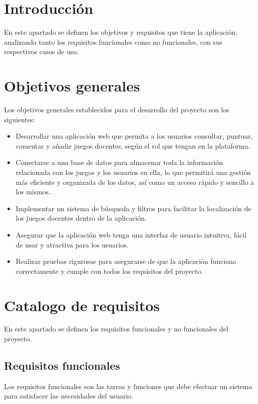 
\section{Introducción}
En este apartado se definen los objetivos y requisitos que tiene la aplicación, analizando tanto los requisitos funcionales como no funcionales, con sus respectivos casos de uso.

\section{Objetivos generales}
Los objetivos generales establecidos para el desarrollo del proyecto son los siguientes:

\begin{itemize}
    \item Desarrollar una aplicación web que permita a los usuarios consultar, puntuar, comentar y añadir juegos docentes, según el rol que tengan en la plataforma.
    \item Conectarse a una base de datos para almacenar toda la información relacionada con los juegos y los usuarios en ella, lo que permitirá una gestión más eficiente y organizada de los datos, así como un acceso rápido y sencillo a los mismos.
    \item Implementar un sistema de búsqueda y filtros para facilitar la localización de los juegos docentes dentro de la aplicación.
    \item Asegurar que la aplicación web tenga una interfaz de usuario intuitiva, fácil de usar y atractiva para los usuarios.
    \item Realizar pruebas rigurosas para asegurarse de que la aplicación funciona correctamente y cumple con todos los requisitos del proyecto.
\end{itemize}

\section{Catalogo de requisitos}
En este apartado se definen los requisitos funcionales y no funcionales del proyecto.

\subsection{Requisitos funcionales}
Los requisitos funcionales son las tareas y funciones que debe efectuar un sistema para satisfacer las necesidades del usuario.

